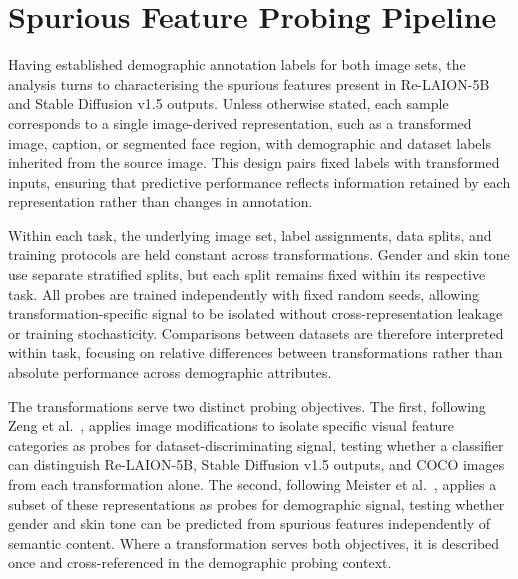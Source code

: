 \section{Spurious Feature Probing Pipeline}
\label{sec:transformation_pipeline}

Having established demographic annotation labels for both image sets, the analysis turns to characterising the spurious features present in Re-LAION-5B and Stable Diffusion v1.5 outputs. Unless otherwise stated, each sample corresponds to a single image-derived representation, such as a transformed image, caption, or segmented face region, with demographic and dataset labels inherited from the source image. This design pairs fixed labels with transformed inputs, ensuring that predictive performance reflects information retained by each representation rather than changes in annotation.

Within each task, the underlying image set, label assignments, data splits, and training protocols are held constant across transformations. Gender and skin tone use separate stratified splits, but each split remains fixed within its respective task. All probes are trained independently with fixed random seeds, allowing transformation-specific signal to be isolated without cross-representation leakage or training stochasticity. Comparisons between datasets are therefore interpreted within task, focusing on relative differences between transformations rather than absolute performance across demographic attributes.

The transformations serve two distinct probing objectives. The first, following Zeng et al.\ \cite{Zeng_2024_UnderstandingBiasinLargeScaleVisualDatasets}, applies image modifications to isolate specific visual feature categories as probes for dataset-discriminating signal, testing whether a classifier can distinguish Re-LAION-5B, Stable Diffusion v1.5 outputs, and COCO images from each transformation alone. The second, following Meister et al.\ \cite{Meister_2023_GenderArtifactsinVisualDatasets}, applies a subset of these representations as probes for demographic signal, testing whether gender and skin tone can be predicted from spurious features independently of semantic content. Where a transformation serves both objectives, it is described once and cross-referenced in the demographic probing context.

